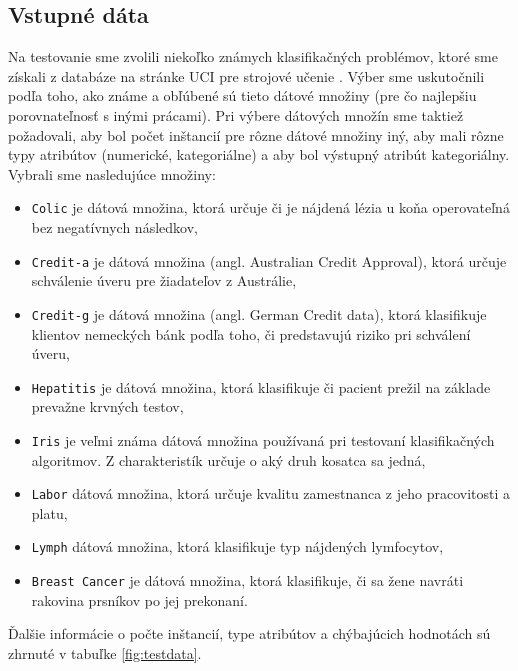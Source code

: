 \subsection{Vstupné dáta}
Na testovanie sme zvolili niekoľko známych klasifikačných problémov, ktoré sme získali z databáze na stránke UCI pre strojové učenie \cite{online-uci}. Výber sme uskutočnili podľa toho, ako známe a obľúbené sú tieto dátové množiny (pre čo najlepšiu porovnateľnosť s inými prácami). Pri výbere dátových množín sme taktiež požadovali, aby bol počet inštancií pre rôzne dátové množiny iný, aby mali rôzne typy atribútov (numerické, kategoriálne) a aby bol výstupný atribút kategoriálny. Vybrali sme nasledujúce množiny:
\begin{itemize}
\item \verb|Colic| je dátová množina, ktorá určuje či je nájdená lézia u koňa operovateľná bez negatívnych následkov,
\item \verb|Credit-a| je dátová množina (angl. Australian Credit Approval), ktorá určuje schválenie úveru pre žiadateľov z Austrálie,
\item \verb|Credit-g| je dátová množina (angl. German Credit data), ktorá klasifikuje klientov nemeckých bánk podľa toho, či predstavujú riziko pri schválení úveru,
\item \verb|Hepatitis| je dátová množina, ktorá klasifikuje či pacient prežil na základe prevažne krvných testov,
\item \verb|Iris| je veľmi známa dátová množina používaná pri testovaní klasifikačných algoritmov. Z charakteristík určuje o aký druh kosatca sa jedná,
\item \verb|Labor| dátová množina, ktorá určuje kvalitu zamestnanca z jeho pracovitosti a platu,
\item \verb|Lymph| dátová množina, ktorá klasifikuje typ nájdených lymfocytov,
\item \verb|Breast Cancer| je dátová množina, ktorá klasifikuje, či sa žene navráti rakovina prsníkov po jej prekonaní.
\end{itemize}

Ďalšie informácie o počte inštancií, type atribútov a chýbajúcich hodnotách
sú zhrnuté v tabuľke \ref{fig:testdata}.

